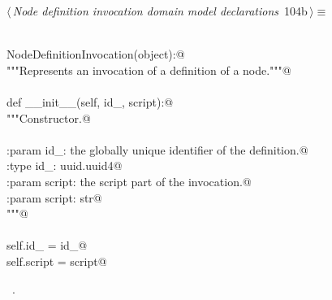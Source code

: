 \documentclass[
    a4paper,      %
    10pt,         %
    openright,    %
    notitlepage,  %
    parskip=half, %
]{scrreprt}       %
\theoremstyle{definition}                    %
\begin{document}
\begin{flushleft}
\begin{minipage}{\linewidth}
\begin{list}{}{\setlength{\itemsep}{-\parsep}\setlength{\itemindent}{-\leftmargin}}
\item{}
\end{list}
\end{minipage}\vspace{4ex}
\end{flushleft}
\begin{flushleft} \small
\begin{minipage}{\linewidth}\label{scrap170}\raggedright\small
{} $\langle\,${\itshape Node definition invocation domain model declarations}\nobreak\ {\footnotesize {104b}}$\,\rangle\equiv$
\vspace{-1exm}
\begin{list}{}{} \item
\mbox{}\lstinline@@\\
\mbox{}\lstinline@class NodeDefinitionInvocation(object):@\\
\mbox{}\lstinline@    """Represents an invocation of a definition of a node."""@\\
\mbox{}\lstinline@@\\
\mbox{}\lstinline@    def __init__(self, id_, script):@\\
\mbox{}\lstinline@        """Constructor.@\\
\mbox{}\lstinline@@\\
\mbox{}\lstinline@        :param id_: the globally unique identifier of the definition.@\\
\mbox{}\lstinline@        :type  id_: uuid.uuid4@\\
\mbox{}\lstinline@        :param script: the script part of the invocation.@\\
\mbox{}\lstinline@        :param script: str@\\
\mbox{}\lstinline@        """@\\
\mbox{}\lstinline@@\\
\mbox{}\lstinline@        self.id_ = id_@\\
\mbox{}\lstinline@        self.script = script@{\NWsep}
\end{list}
\vspace{-1.5ex}
\footnotesize
\begin{list}{}{\setlength{\itemsep}{-\parsep}\setlength{\itemindent}{-\leftmargin}}
\item \NWtxtMacroRefIn\ .

\item{}
\end{list}
\end{minipage}\vspace{4ex}
\end{flushleft}
\end{document}
